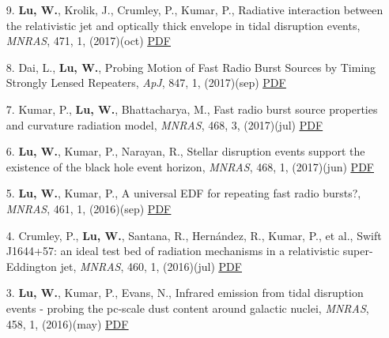 \begin{itemize}[leftmargin=0.65cm]
\vspace{-0.1cm}
\item[9.]{{\bf Lu, W.}, Krolik, J., Crumley, P., Kumar, P., {Radiative interaction between the relativistic jet and optically thick envelope in tidal disruption events}, {\it MNRAS}, 471, 1, (2017)(oct) \href{https://ui.adsabs.harvard.edu/abs/2017MNRAS.471.1141L}{\underline{PDF}}}

\vspace{-0.1cm}
\item[8.]{Dai, L., {\bf Lu, W.}, {Probing Motion of Fast Radio Burst Sources by Timing Strongly Lensed Repeaters}, {\it ApJ}, 847, 1, (2017)(sep) \href{https://ui.adsabs.harvard.edu/abs/2017ApJ...847...19D}{\underline{PDF}}}

\vspace{-0.1cm}
\item[7.]{Kumar, P., {\bf Lu, W.}, Bhattacharya, M., {Fast radio burst source properties and curvature radiation model}, {\it MNRAS}, 468, 3, (2017)(jul) \href{https://ui.adsabs.harvard.edu/abs/2017MNRAS.468.2726K}{\underline{PDF}}}

\vspace{-0.1cm}
\item[6.]{{\bf Lu, W.}, Kumar, P., Narayan, R., {Stellar disruption events support the existence of the black hole event horizon}, {\it MNRAS}, 468, 1, (2017)(jun) \href{https://ui.adsabs.harvard.edu/abs/2017MNRAS.468..910L}{\underline{PDF}}}

\vspace{-0.1cm}
\item[5.]{{\bf Lu, W.}, Kumar, P., {A universal EDF for repeating fast radio bursts?}, {\it MNRAS}, 461, 1, (2016)(sep) \href{https://ui.adsabs.harvard.edu/abs/2016MNRAS.461L.122L}{\underline{PDF}}}

\vspace{-0.1cm}
\item[4.]{Crumley, P., {\bf Lu, W.}, Santana, R., Hern{\'a}ndez, R., Kumar, P., et al., {Swift J1644+57: an ideal test bed of radiation mechanisms in a relativistic super-Eddington jet}, {\it MNRAS}, 460, 1, (2016)(jul) \href{https://ui.adsabs.harvard.edu/abs/2016MNRAS.460..396C}{\underline{PDF}}}

\vspace{-0.1cm}
\item[3.]{{\bf Lu, W.}, Kumar, P., Evans, N., {Infrared emission from tidal disruption events - probing the pc-scale dust content around galactic nuclei}, {\it MNRAS}, 458, 1, (2016)(may) \href{https://ui.adsabs.harvard.edu/abs/2016MNRAS.458..575L}{\underline{PDF}}}


\end{itemize}
